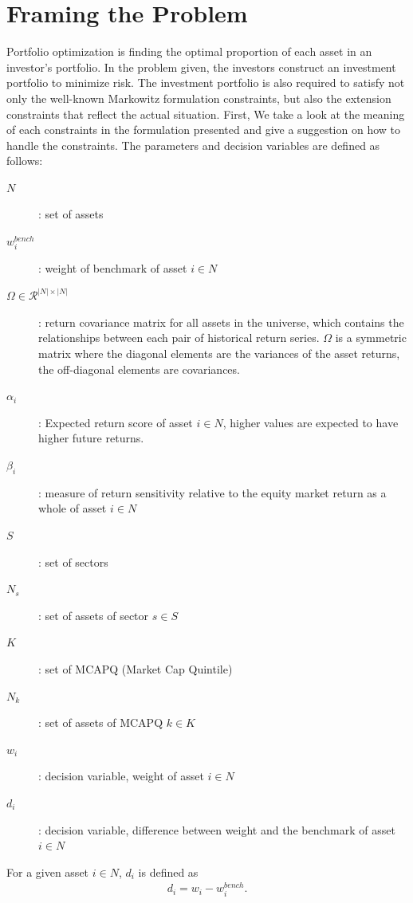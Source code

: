 \documentclass[11pt]{article}
\begin{document}
	
	\section*{Framing the Problem}
	Portfolio optimization is finding the optimal proportion of each asset in an investor’s portfolio. In the problem given, the investors construct an investment portfolio to minimize risk. The investment portfolio is also required to satisfy not only the well-known Markowitz formulation constraints, but also the extension constraints that reflect the actual situation. First, We take a look at the meaning of each constraints in the formulation presented and give a suggestion on how to handle the constraints.
	The parameters and decision variables are defined as follows:
	\begin{description}
		\item[$N$]: set of assets
		\item[$w^{bench}_i$]: weight of benchmark of asset $i \in N$
		\item[$\Omega \in \mathcal{R}^{|N|\times |N|}$]: return covariance matrix for all assets in the universe, which contains the relationships between each pair of historical return series. $\Omega$ is a symmetric matrix where the diagonal elements are the variances of the asset returns, the off-diagonal elements are covariances.
		\item[$\alpha_i$]: Expected return score of asset $i \in N$, higher values are expected to have higher future returns.
		\item[$\beta_i$]: measure of return sensitivity relative to the equity market return as a whole of asset $i \in N$ 
		\item[$S$]: set of sectors
		\item[$N_s$]: set of assets of sector $s \in S$
		\item[$K$]: set of MCAPQ (Market Cap Quintile)
		\item[$N_k$]: set of assets of MCAPQ $k \in K$
		\item[$w_i$]: decision variable, weight of asset $i \in N$
		\item[$d_i$]: decision variable, difference between weight and the benchmark of asset $i \in N$
	\end{description}
	
	
	For a given asset $i \in N$, $d_i$ is defined as
	\begin{align}
	d_i = w_i - w^{bench}_i. \label{eq:P:activeweight}
	\end{align}
	
\end{document}

